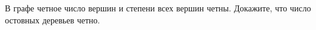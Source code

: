 В графе четное число вершин и степени всех вершин четны. Докажите, что число остовных деревьев четно.